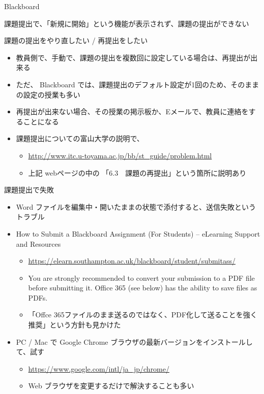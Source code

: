 \documentclass[a4j,10pt]{jsarticle}
\begin{document}
{\begin{frame}[label={sec:org166405d},fragile]{Blackboard}
\begin{block}{課題提出で、「新規に開始」という機能が表示されず、課題の提出ができない}
\end{block}
\par
\begin{block}{課題の提出をやり直したい / 再提出をしたい}
\begin{itemize}
\item 教員側で、手動で、課題の提出を複数回に設定している場合は、再提出が出来る
\item ただ、 Blackboard では、課題提出のデフォルト設定が1回のため、そのままの設定の授業も多い
\item 再提出が出来ない場合、その授業の掲示板か、Eメールで、教員に連絡をすることになる
\item 課題提出についての富山大学の説明で、
\begin{itemize}
\item \url{http://www.itc.u-toyama.ac.jp/bb/st\_guide/problem.html}
\item 上記 webページの中の 「6.3　課題の再提出」という箇所に説明あり
\end{itemize}
\end{itemize}
\end{block}
\par
\begin{block}{課題提出で失敗}
\begin{itemize}
\item Word ファイルを編集中・開いたままの状態で添付すると、送信失敗というトラブル
\par
\item How to Submit a Blackboard Assignment (For Students) – eLearning Support and Resources
\begin{itemize}
\item \url{https://elearn.southampton.ac.uk/blackboard/student/submitass/}
\item You are strongly recommended to convert your submission to a PDF file before submitting it.
Office 365 (see below) has the ability to save files as PDFs.
\item 「Offce 365ファイルのまま送るのではなく、PDF化して送ることを強く推奨」という方針も見かけた
\end{itemize}
\par
\item PC / Mac で Google Chrome ブラウザの最新バージョンをインストールして、試す
\begin{itemize}
\item \url{https://www.google.com/intl/ja\_jp/chrome/}
\item Web ブラウザを変更するだけで解決することも多い
\end{itemize}

\end{itemize}
\end{block}
\end{frame}}
\end{document}
